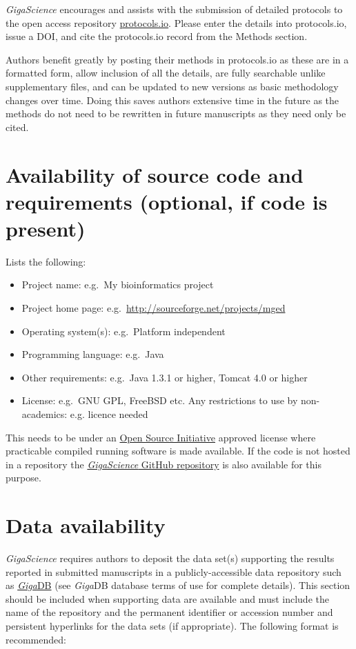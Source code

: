 \documentclass[a4paper,num-refs]{oup-contemporary}
\begin{document}
\emph{GigaScience} encourages and assists with the submission of detailed protocols to the open access repository \href{https://www.protocols.io/}{protocols.io}. Please enter the details into protocols.io, issue a DOI, and cite the protocols.io record from the Methods section.

Authors benefit greatly by posting their methods in protocols.io as these are in a formatted form, allow inclusion of all the details, are fully searchable unlike supplementary files, and can be updated to new versions as basic methodology changes over time. Doing this saves authors extensive time in the future as the methods do not need to be rewritten in future manuscripts as they need only be cited.

\section{Availability of source code and requirements (optional, if code is present)}

Lists the following:
\begin{itemize}
\item Project name: e.g.~My bioinformatics project
\item Project home page: e.g.~\url{http://sourceforge.net/projects/mged}
\item Operating system(s): e.g.~Platform independent
\item Programming language: e.g.~Java
\item Other requirements: e.g.~Java 1.3.1 or higher, Tomcat 4.0 or higher
\item License: e.g.~GNU GPL, FreeBSD etc.
Any restrictions to use by non-academics: e.g. licence needed
\end{itemize}

This needs to be under an \href{http:/opensource.org/licenses}{Open Source Initiative} approved license where practicable compiled running software is made available. If the code is not hosted in a repository the \href{https://github.com/gigascience}{\textit{GigaScience} GitHub repository} is also available for this purpose.

\section{Data availability}

\textit{GigaScience} requires authors to deposit the data set(s) supporting the results reported in submitted manuscripts in a publicly-accessible data repository such as \href{http://gigadb.org/}{\textit{Giga}DB} (see \textit{Giga}DB database terms of use for complete details). This section should be included when supporting data are available and must include the name of the repository and the permanent identifier or accession number and persistent hyperlinks for the data sets (if appropriate). The following format is recommended:
\end{document}
